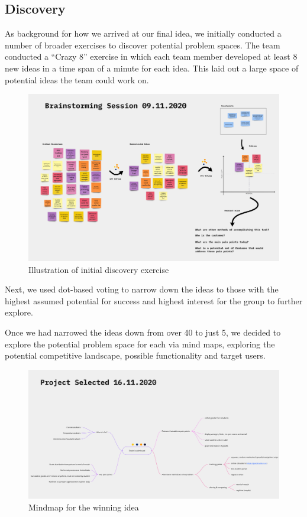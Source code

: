 \subsection{Discovery}
As background for how we arrived at our final idea, we initially conducted a number of broader exercises to discover potential problem spaces. The team conducted a ``Crazy 8'' exercise in which each team member developed at least 8 new ideas in a time span of a minute for each idea. This laid out a large space of potential ideas the team could work on.

\begin{figure}[H]
    \centering
    \includegraphics[width=\textwidth]{images/brainstorm.png}
    \caption{Illustration of initial discovery exercise}
    \label{fig:brainstorm}
\end{figure}

Next, we used dot-based voting to narrow down the ideas to those with the highest assumed potential for success and highest interest for the group to further explore. 

Once we had narrowed the ideas down from over 40 to just 5, we decided to explore the potential problem space for each via mind maps, exploring the potential competitive landscape, possible functionality and target users.

\begin{figure}[H]
    \centering
\includegraphics[width=\textwidth]{images/mindmap.png}
    \caption{Mindmap for the winning idea}
    \label{fig:mindmap}
\end{figure}

